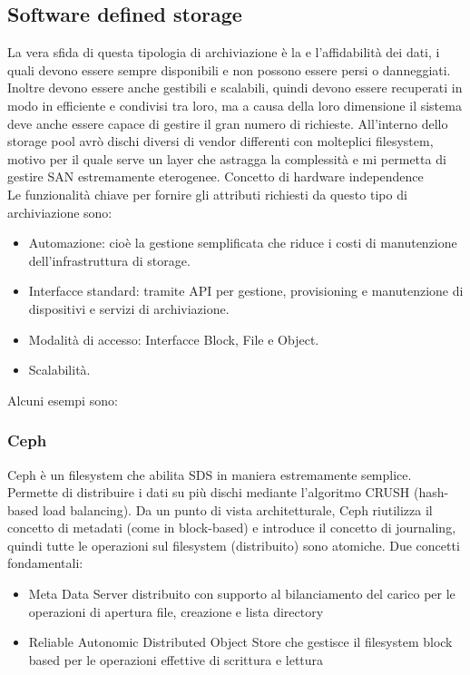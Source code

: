 \documentclass{article}
\begin{document}
		\subsection{Software defined storage}
		La vera sfida di questa tipologia di archiviazione è la  e l'affidabilità dei dati, i quali devono essere sempre disponibili e non possono essere persi o danneggiati.\\
		Inoltre devono essere anche gestibili e scalabili, quindi devono essere recuperati in modo in efficiente e condivisi tra loro, ma a causa della loro dimensione il sistema deve anche essere capace di gestire il gran numero di richieste.
		All’interno dello storage pool avrò dischi diversi di vendor differenti con molteplici filesystem, motivo per il quale serve un layer che astragga la complessità e mi permetta di gestire SAN estremamente eterogenee. Concetto di hardware independence\\
		Le funzionalità chiave per fornire gli attributi richiesti da questo tipo di archiviazione sono:
		\begin{itemize}
		    \item Automazione: cioè la gestione semplificata che riduce i costi di manutenzione dell'infrastruttura di storage.
		    \item Interfacce standard: tramite API per gestione, provisioning e manutenzione di dispositivi e servizi di archiviazione.
		    \item Modalità di accesso: Interfacce Block, File e Object.
		    \item Scalabilità.
		\end{itemize}
		Alcuni esempi sono:
		\subsubsection{Ceph}
		Ceph è un filesystem che abilita SDS in maniera estremamente semplice. Permette di distribuire i dati su più dischi mediante l’algoritmo
		CRUSH (hash-based load balancing). Da un punto di vista architetturale, Ceph riutilizza il concetto di metadati (come in block-based) e introduce il concetto di journaling, quindi tutte le operazioni sul filesystem (distribuito) sono atomiche.
		Due concetti fondamentali:
		\begin{itemize}
		\item Meta Data Server distribuito con supporto al bilanciamento del carico per le operazioni di apertura file, creazione e lista directory
		\item Reliable Autonomic Distributed Object Store che gestisce il filesystem block based per le operazioni effettive di scrittura e lettura
		\end{itemize}
		
\end{document}
